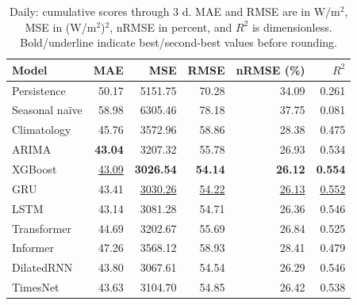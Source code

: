 \begin{table}[!htbp]
\centering
\small
\setlength{\tabcolsep}{6pt}
\caption{Daily: cumulative scores through 3 d. MAE and RMSE are in W/m$^2$, MSE in (W/m$^2$)$^2$, nRMSE in percent, and $R^2$ is dimensionless. Bold/underline indicate best/second-best values before rounding.}
\label{tab:baseline_daily_30_3}
\begin{tabular}{@{}lrrrrr@{}}
\toprule
Model & MAE & MSE & RMSE & nRMSE (\%) & $R^2$ \\
\midrule
Persistence & 50.17 & 5151.75 & 70.28 & 34.09 & 0.261 \\
Seasonal na\"ive & 58.98 & 6305.46 & 78.18 & 37.75 & 0.081 \\
Climatology & 45.76 & 3572.96 & 58.86 & 28.38 & 0.475 \\
ARIMA & \textbf{43.04} & 3207.32 & 55.78 & 26.93 & 0.534 \\
XGBoost & \underline{43.09} & \textbf{3026.54} & \textbf{54.14} & \textbf{26.12} & \textbf{0.554} \\
GRU & 43.41 & \underline{3030.26} & \underline{54.22} & \underline{26.13} & \underline{0.552} \\
LSTM & 43.14 & 3081.28 & 54.71 & 26.36 & 0.546 \\
Transformer & 44.69 & 3202.67 & 55.69 & 26.84 & 0.525 \\
Informer & 47.26 & 3568.12 & 58.93 & 28.41 & 0.479 \\
DilatedRNN & 43.80 & 3067.61 & 54.54 & 26.29 & 0.546 \\
TimesNet & 43.63 & 3104.70 & 54.85 & 26.42 & 0.538 \\
\bottomrule
\end{tabular}
\end{table}

